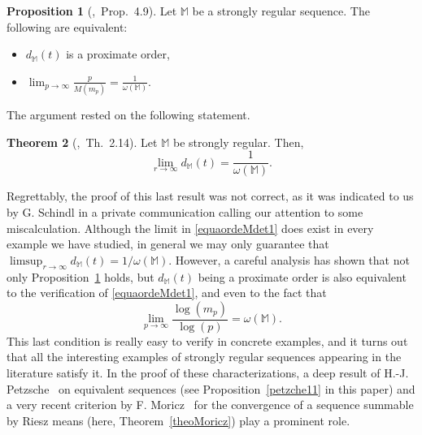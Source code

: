 \documentclass[11pt,a4paper]{article}
\theoremstyle{definition}
\newtheorem{theo}{Theorem}[section]
\newtheorem{pro}[theo]{Proposition}
\newenvironment{prop}{\smallskip\begin{pro}}{\end{pro}\smallskip}
\def\oo{\infty}
\def\ri{\rightarrow}
\def\o{\omega}
\def\M{\mathbb{M}}
\begin{document}
\begin{prop}[\cite{SanzFlat},\ Prop.\ 4.9]\label{propcaracdderordenaprox0}
Let $\M$ be a strongly regular sequence. The following are equivalent:
\begin{itemize}
\item[(i)] $d_{\M}(t)$ is a proximate order,
\item[(ii)] $\displaystyle\lim_{p\to\infty}\frac{p}{M(m_{p})}=\frac{1}{\omega(\M)}$.
\end{itemize}
\end{prop}

\noindent The argument rested on the following statement.

\begin{theo}[\cite{SanzFlat},\ Th.\ 2.14]%
Let $\M$ be strongly regular. Then,
\begin{equation}\label{equaordeMdet1}
\lim_{r\to\infty}d_{\M}(t)=\frac{1}{\omega(\M)}.
\end{equation}
\end{theo}

Regrettably, the proof of this last result was not correct, as it was indicated to us by G. Schindl in a private communication calling our attention to some miscalculation. Although the limit in \eqref{equaordeMdet1} does exist in every example we have studied, in general we may only guarantee that $\limsup_{r\to\infty}d_{\M}(t)=1/\omega(\M)$. However, a careful analysis has shown that not only Proposition~\ref{propcaracdderordenaprox0} holds, but $d_{\M}(t)$ being a proximate order is also equivalent to the verification of \eqref{equaordeMdet1}, and even to the fact that
$$
\lim_{p\ri \oo} \frac{\log (m_p)}{\log(p)}=\o(\M).
$$
This last condition is really easy to verify in concrete examples, and it turns out that all the interesting examples of strongly regular sequences appearing in the literature satisfy it. In the proof of these characterizations, a deep result of H.-J. Petzsche~\cite{Pet} on equivalent sequences (see Proposition~\ref{petzche11} in this paper) and a very recent criterion by F. Moricz~\cite{Moricz} for the convergence of a sequence summable by Riesz means (here, Theorem~\ref{theoMoricz}) play a prominent role.
\end{document}
